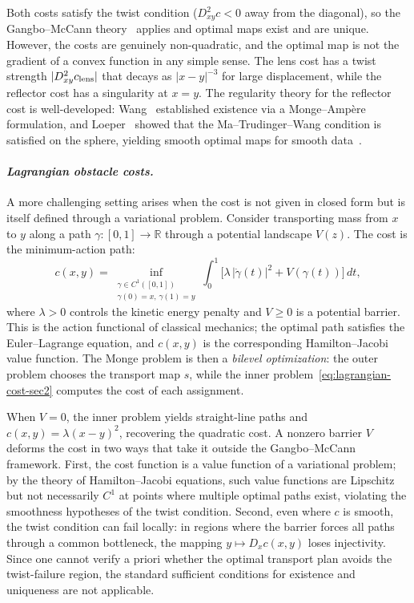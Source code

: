 \documentclass[12pt,leqno]{amsart}
\begin{document}
Both costs satisfy the twist condition ($D^2_{xy}c < 0$ away from the diagonal), so the Gangbo--McCann theory~\citep{GangboMcCann1996} applies and optimal maps exist and are unique. However, the costs are genuinely non-quadratic, and the optimal map is not the gradient of a convex function in any simple sense. The lens cost has a twist strength $|D^2_{xy}c_{\textup{lens}}|$ that decays as $|x-y|^{-3}$ for large displacement, while the reflector cost has a singularity at $x = y$. The regularity theory for the reflector cost is well-developed: Wang~\citep{wang2004design} established existence via a Monge--Amp\`ere formulation, and Loeper~\citep{loeper2011regularity} showed that the Ma--Trudinger--Wang condition is satisfied on the sphere, yielding smooth optimal maps for smooth data~\citep{ma2005regularity,loeper2009regularity}.

\paragraph{\it Lagrangian obstacle costs.}
A more challenging setting arises when the cost is not given in closed form but is itself defined through a variational problem. Consider transporting mass from $x$ to $y$ along a path $\gamma:[0,1] \to \mathbb{R}$ through a potential landscape $V(z)$. The cost is the minimum-action path:
\begin{equation}\label{eq:lagrangian-cost-sec2}
    c(x,y) = \inf_{\substack{\gamma \in C^1([0,1]) \\ \gamma(0)=x,\, \gamma(1)=y}}
    \int_0^1 \bigl[\lambda\,|\dot\gamma(t)|^2 + V(\gamma(t))\bigr]\, dt,
\end{equation}
where $\lambda > 0$ controls the kinetic energy penalty and $V \geq 0$ is a potential barrier. This is the action functional of classical mechanics; the optimal path satisfies the Euler--Lagrange equation, and $c(x,y)$ is the corresponding Hamilton--Jacobi value function. The Monge problem is then a \emph{bilevel optimization}: the outer problem chooses the transport map $s$, while the inner problem~\eqref{eq:lagrangian-cost-sec2} computes the cost of each assignment.

When $V = 0$, the inner problem yields straight-line paths and $c(x,y) = \lambda(x-y)^2$, recovering the quadratic cost. A nonzero barrier $V$ deforms the cost in two ways that take it outside the Gangbo--McCann framework. First, the cost function is a value function of a variational problem; by the theory of Hamilton--Jacobi equations, such value functions are Lipschitz but not necessarily $C^1$ at points where multiple optimal paths exist, violating the smoothness hypotheses of the twist condition. Second, even where $c$ is smooth, the twist condition can fail locally: in regions where the barrier forces all paths through a common bottleneck, the mapping $y \mapsto D_x c(x,y)$ loses injectivity. Since one cannot verify a priori whether the optimal transport plan avoids the twist-failure region, the standard sufficient conditions for existence and uniqueness are not applicable.
\end{document}
